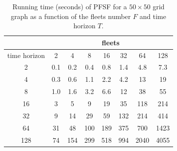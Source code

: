 \documentclass[conference]{IEEEtran}
\begin{document}
\begin{table}[]
\centering
\begin{tabular}{c|c|c|c|c|c|c|c|}
\cline{2-8}
                                   & \multicolumn{7}{c|}{fleets}    \\ \hline
\multicolumn{1}{|L||}{time horizon} & 2 & 4 & 8 & 16 & 32 & 64 & 128 \\ \hline \hline
\multicolumn{1}{|c||}{2}            & 0.1 & 0.2 & 0.4 & 0.8 & 1.4 & 4.8 & 7.3  \\ \hline
\multicolumn{1}{|c||}{4}            & 0.3 & 0.6 & 1.1 & 2.2 & 4.2 & 13 & 19  \\ \hline
\multicolumn{1}{|c||}{8}            &  1.0 & 1.6 & 3.2 & 6.6 & 12 & 38 & 55  \\ \hline
\multicolumn{1}{|c||}{16}           &  3 & 5 & 9 & 19 & 35 & 118 & 214   \\ \hline
\multicolumn{1}{|c||}{32}           &   9 & 14 & 29 & 59 & 132 & 214 & 414  \\ \hline
\multicolumn{1}{|c||}{64}           &   31 & 48 & 100 & 189 & 375 & 700 & 1423  \\ \hline
\multicolumn{1}{|c||}{128}          &  74 & 154 & 299 & 518 & 994 & 2040 & 4055   \\ \hline
\end{tabular}
\vspace{5pt}
\caption{Running time (seconds) of PFSF for a $50\times 50$ grid graph as a function of the fleets number $F$ and time horizon $T$. \label{tbl:pfsf}}
\end{table}
\end{document}
